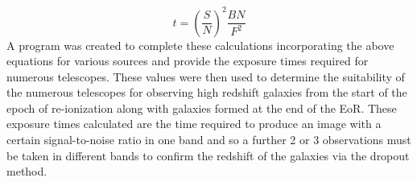 \documentclass[pdf,color]{UoBnote}
\begin{document}
\newline
\begin{equation}
t = (\frac{S}{N})^2 \frac{BN}{F^2}
\end{equation}
\newline  
A program was created to complete these calculations incorporating the above equations for various sources and provide the exposure times required for numerous telescopes. These values were then used to determine the suitability of the numerous telescopes for observing high redshift galaxies from the start of the epoch of re-ionization along with galaxies formed at the end of the EoR. These exposure times calculated are the time required to produce an image with a certain signal-to-noise ratio in one band and so a further 2 or 3 observations must be taken in different bands to confirm the redshift of the galaxies via the dropout method. 
\end{document}
